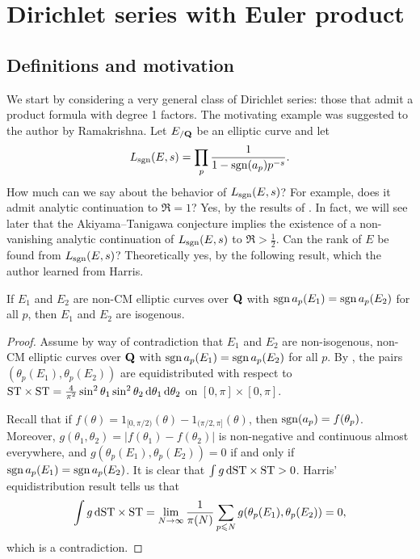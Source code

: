 
\chapter{Dirichlet series with Euler product}\label{ch:Dirichlet-series}





\section{Definitions and motivation}

We start by considering a very general class of Dirichlet series: those that 
admit a product formula with degree 1 factors. The motivating example was 
suggested to the author by Ramakrishna. Let $E_{/\mathbf{Q}}$ be an elliptic 
curve and let 
\[
	L_{\operatorname{sgn}}(E,s) = \prod_p \frac{1}{1-\operatorname{sgn}(a_p) p^{-s}} .
\]
How much can we say about the behavior of $L_{\operatorname{sgn}}(E,s)$? For example, does it 
admit analytic continuation to $\Re = 1$? Yes, by the results of 
\cite[A.2]{serre-1989}. In fact, we will see later that the Akiyama--Tanigawa 
conjecture implies the existence of a non-vanishing analytic continuation of 
$L_{\operatorname{sgn}}(E,s)$ to $\Re > \frac 1 2$. Can the rank of $E$ be 
found from $L_{\operatorname{sgn}}(E,s)$? Theoretically yes, by the following result, which 
the author learned from Harris. 

\begin{theorem}
If $E_1$ and $E_2$ are non-CM elliptic curves over $\mathbf{Q}$ with 
$\operatorname{sgn} a_p(E_1) = \operatorname{sgn} a_p(E_2)$ for all $p$, then $E_1$ and $E_2$ are 
isogenous.
\end{theorem}
\begin{proof}
Assume by way of contradiction that $E_1$ and $E_2$ are non-isogenous, non-CM 
elliptic curves over $\mathbf{Q}$ with $\operatorname{sgn} a_p(E_1) = \operatorname{sgn} a_p(E_2)$ for all $p$. By 
\cite[5.4]{harris-2009}, the pairs $(\theta_p(E_1),\theta_p(E_2))$ are 
equidistributed with respect to 
$\mathrm{ST}\times \mathrm{ST} = \frac{4}{\pi^2} \sin^2\theta_1\sin^2\theta_2\, \mathrm{d}\theta_1\, \mathrm{d}\theta_2$ 
on $[0,\pi]\times [0,\pi]$. 

Recall that if $f(\theta) = 1_{[0,\pi/2)}(\theta) - 1_{(\pi/2,\pi]}(\theta)$, 
then $\operatorname{sgn}(a_p) = f(\theta_p)$. Moreover, 
$g(\theta_1,\theta_2) = |f(\theta_1) - f(\theta_2)|$ is non-negative and 
continuous almost everywhere, and $g(\theta_p(E_1),\theta_p(E_2)) = 0$ if and 
only if $\operatorname{sgn} a_p(E_1) = \operatorname{sgn} a_p(E_2)$. It is clear that 
$\int g\, \mathrm{d} \mathrm{ST}\times \mathrm{ST} > 0$. Harris' equidistribution result tells us that 
\[
	\int g\, \mathrm{d} \mathrm{ST}\times\mathrm{ST} = \lim_{N\to \infty} \frac{1}{\pi(N)} \sum_{p\leqslant N} g(\theta_p(E_1),\theta_p(E_2)) = 0 ,
\]
which is a contradiction. 
\end{proof}

